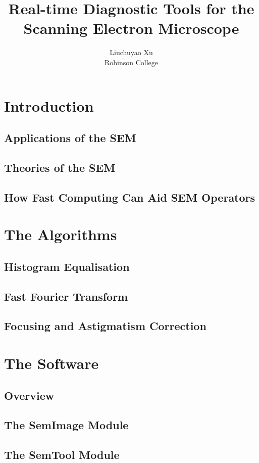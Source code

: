 \documentclass{article}
\title{Real-time Diagnostic Tools for the Scanning Electron Microscope}
\author{Liuchuyao Xu\\Robinson College}
\begin{document}
\maketitle
\tableofcontents

\newpage
\section{Introduction}
\subsection{Applications of the SEM}
\subsection{Theories of the SEM}
\subsection{How Fast Computing Can Aid SEM Operators}

\section{The Algorithms}
\subsection{Histogram Equalisation}
\subsection{Fast Fourier Transform}
\subsection{Focusing and Astigmatism Correction}

\section{The Software}
\subsection{Overview}
\subsection{The SemImage Module}
\subsection{The SemTool Module}
\end{document}
